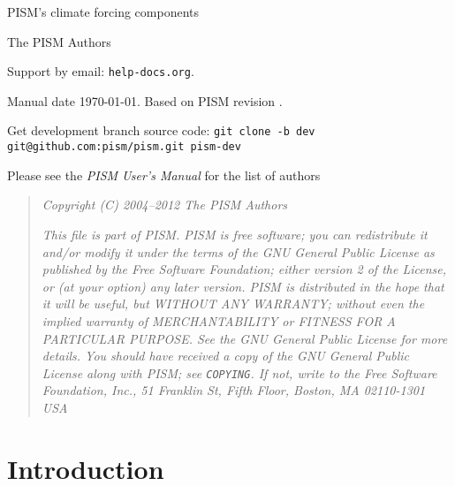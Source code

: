 \documentclass[titlepage,letterpaper,final]{scrartcl}
\makeatletter
\newcommand{\PISMREV}{revision }
\newcommand{\PISMDOWNLOADMSG}{Get development branch source code: \quad\texttt{git clone -b dev git@github.com:pism/pism.git pism-dev} \quad}
\makeatother
\begin{document}
\begin{titlepage}

  \begin{center}
    \vspace*{3.5cm}
    {\huge{} PISM's climate forcing components}
    \vspace{0.5cm}

    {\Large The PISM Authors}
    \vspace{1cm}

    \vfill

    \small Support by email: \texttt{help\@@pism-docs.org}.
    \medskip

    Manual date \today. Based on PISM \PISMREV.
    \medskip

    \PISMDOWNLOADMSG
  \end{center}
\end{titlepage}

\newpage
\phantom{bob}

\begin{center}
  Please see the \emph{PISM User's Manual} for the list of authors
\end{center}

\vspace{0.2in}
\begin{quote}
  \textsl{Copyright (C) 2004--2012 The PISM Authors}
  \medskip

  \noindent \textsl{This file is part of PISM.  PISM is free software; you can redistribute it and/or modify it under the terms of the GNU General Public License as published by the Free Software Foundation; either version 2 of the License, or (at your option) any later version.  PISM is distributed in the hope that it will be useful, but WITHOUT ANY WARRANTY; without even the implied warranty of MERCHANTABILITY or FITNESS FOR A PARTICULAR PURPOSE.  See the GNU General Public License for more details.  You should have received a copy of the GNU General Public License along with PISM; see \emph{\texttt{COPYING}}.  If not, write to the Free Software Foundation, Inc., 51 Franklin St, Fifth Floor, Boston, MA  02110-1301 USA}
\end{quote}

\newpage
\setcounter{tocdepth}{3}
\small
\tableofcontents
\normalsize

\newpage


\section{Introduction}
\label{sect:intro}
\end{document}

